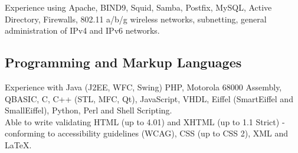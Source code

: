 \documentclass[a4paper, 11pt] {article}
\begin{document}
Experience using Apache, BIND9, Squid, Samba, Postfix, MySQL, Active 
Directory, Firewalls, 802.11 a/b/g wireless networks, subnetting, general
administration of IPv4 and IPv6 networks. 

\subsection*{Programming and Markup Languages}

Experience with Java (J2EE, WFC, Swing) PHP, Motorola 68000 Assembly, QBASIC,
C, C++ (STL, MFC, Qt), JavaScript, VHDL, Eiffel (SmartEiffel and 
SmallEiffel), Python, Perl and Shell Scripting. \\

Able to write validating HTML (up to 4.01) and XHTML (up 
to 1.1 Strict) - conforming to accessibility guidelines (WCAG), CSS (up to 
CSS 2), XML and LaTeX.
\end{document}
